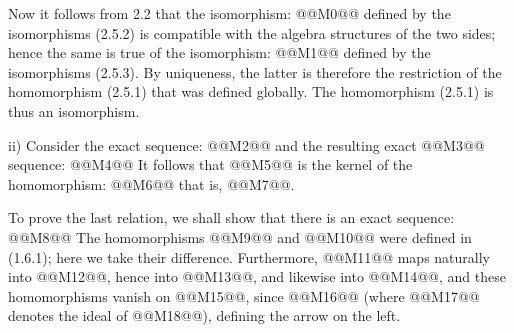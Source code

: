 Now it follows from 2.2 that the isomorphism:
@@M0@@
defined by the isomorphisms (2.5.2) is compatible with the algebra structures of the two sides; hence the same is true of the isomorphism:
@@M1@@
defined by the isomorphisms (2.5.3). By uniqueness, the latter is therefore the restriction of the homomorphism (2.5.1) that was defined globally. The homomorphism (2.5.1) is thus an isomorphism.

ii) Consider the exact sequence:
@@M2@@
and the resulting exact @@M3@@ sequence:
@@M4@@
It follows that @@M5@@ is the kernel of the homomorphism:
@@M6@@
that is, @@M7@@.

To prove the last relation, we shall show that there is an exact sequence:
@@M8@@
The homomorphisms @@M9@@ and @@M10@@ were defined in (1.6.1); here we take their difference. Furthermore, @@M11@@ maps naturally into @@M12@@, hence into @@M13@@, and likewise into @@M14@@, and these homomorphisms vanish on @@M15@@, since @@M16@@ (where @@M17@@ denotes the ideal of @@M18@@), defining the arrow on the left.

